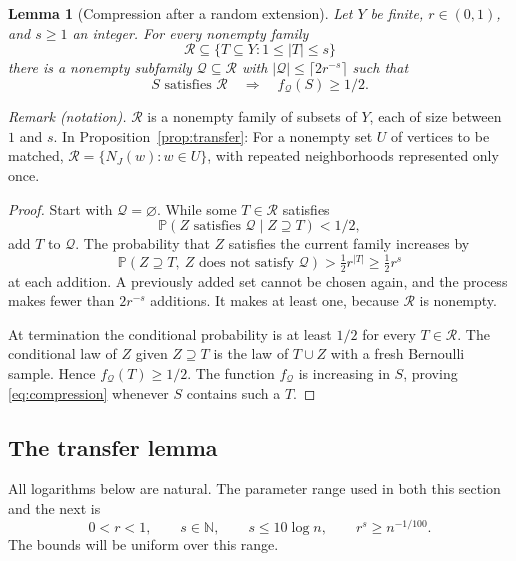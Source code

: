 \documentclass[11pt]{article}
\newtheorem{lemma}[theorem]{Lemma}
\theoremstyle{remark}
\numberwithin{equation}{section}
\newcommand{\Prob}{\mathbb P}
\newcommand{\calQ}{\mathcal Q}
\newcommand{\calR}{\mathcal R}
\begin{document}
\begin{lemma}[Compression after a random extension]
\label{lem:compression}
Let $Y$ be finite, $r\in(0,1)$, and $s\geq1$ an integer.
For every nonempty family
\[
 \calR\subseteq\{T\subseteq Y:1\leq|T|\leq s\}
\]
there is a nonempty subfamily $\calQ\subseteq\calR$ with
$|\calQ|\leq\lceil2r^{-s}\rceil$ such that
\begin{equation}\label{eq:compression}
 S\text{ satisfies }\calR\quad\Longrightarrow\quad
 f_{\calQ}(S)\geq1/2.
\end{equation}
\end{lemma}

\noindent\textit{Remark (notation).} $\calR$ is a nonempty family of subsets of $Y$, each of size between $1$ and $s$. In Proposition~\ref{prop:transfer}: For a nonempty set $U$ of vertices to be matched, $\calR=\{N_J(w):w\in U\}$, with repeated neighborhoods represented only once.

\begin{proof}
Start with $\calQ=\varnothing$. While some $T\in\calR$
satisfies
\[
 \Prob(Z\text{ satisfies }\calQ\mid Z\supseteq T)<1/2,
\]
add $T$ to $\calQ$. The probability that $Z$ satisfies the
current family increases by
\[
 \Prob(Z\supseteq T,\ Z\text{ does not satisfy }\calQ)
 >\tfrac12r^{|T|}\geq\tfrac12r^s
\]
at each addition. A previously added set cannot be chosen again,
and the process makes fewer than $2r^{-s}$ additions. It makes
at least one, because $\calR$ is nonempty.

At termination the conditional probability is at least $1/2$
for every $T\in\calR$. The conditional law of $Z$ given
$Z\supseteq T$ is the law of $T\cup Z$ with a fresh Bernoulli
sample. Hence $f_{\calQ}(T)\geq1/2$. The function
$f_{\calQ}$ is increasing in $S$, proving
\eqref{eq:compression} whenever $S$ contains such a $T$.
\end{proof}

\subsection{The transfer lemma}

All logarithms below are natural. The parameter range used in both
this section and the next is
\begin{equation}\label{eq:parameters}
 0<r<1,\qquad s\in\mathbb N,\qquad
 s\leq10\log n,\qquad r^s\geq n^{-1/100}.
\end{equation}
The bounds will be uniform over this range.
\end{document}
